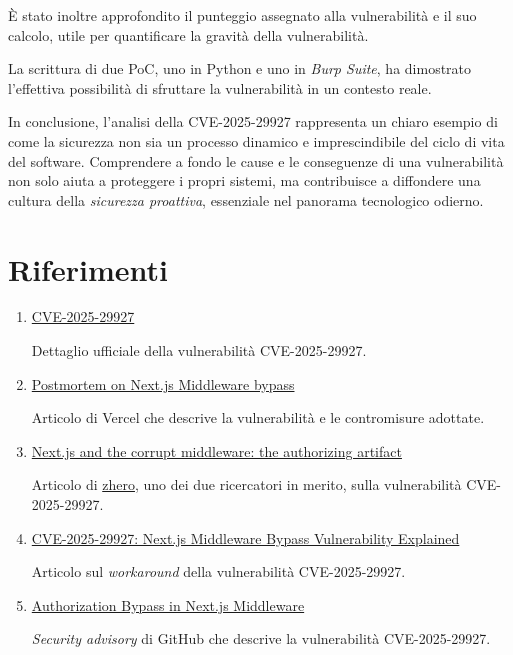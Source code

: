 \documentclass[a4paper,oneside,12pt]{report}
\begin{document}
È stato inoltre approfondito il punteggio assegnato alla vulnerabilit\`a e il suo calcolo, utile per quantificare la gravità della vulnerabilità.

La scrittura di due PoC, uno in Python e uno in \textit{Burp Suite}, ha dimostrato l’effettiva possibilità di sfruttare la vulnerabilit\`a in un contesto reale.

In conclusione, l’analisi della CVE-2025-29927 rappresenta un chiaro esempio di come la sicurezza non sia un processo dinamico e imprescindibile del ciclo di vita del software. Comprendere a fondo le cause e le conseguenze di una vulnerabilità non solo aiuta a proteggere i propri sistemi, ma contribuisce a diffondere una cultura della \emph{sicurezza proattiva}, essenziale nel panorama tecnologico odierno.

\chapter*{Riferimenti}
\label{chap:references}

\begin{enumerate}
	\item \href{https://nvd.nist.gov/vuln/detail/CVE-2025-29927}{CVE-2025-29927}

	Dettaglio ufficiale della vulnerabilità CVE-2025-29927.
	\item \href{https://vercel.com/blog/postmortem-on-next-js-middleware-bypass}{Postmortem on Next.js Middleware bypass}

	Articolo di Vercel che descrive la vulnerabilità e le contromisure adottate.
	\item \href{https://zhero-web-sec.github.io/research-and-things/nextjs-and-the-corrupt-middleware}{Next.js and the corrupt middleware: the authorizing artifact}

	Articolo di \href{https://x.com/zhero___}{zhero}, uno dei due ricercatori in merito, sulla vulnerabilità CVE-2025-29927.
	\item \href{https://www.picussecurity.com/resource/blog/cve-2025-29927-nextjs-middleware-bypass-vulnerability}{CVE-2025-29927: Next.js Middleware Bypass Vulnerability Explained}

	Articolo sul \textit{workaround} della vulnerabilità CVE-2025-29927.
	\item \href{https://github.com/vercel/next.js/security/advisories/GHSA-f82v-jwr5-mffw}{Authorization Bypass in Next.js Middleware}

	\emph{Security advisory} di GitHub che descrive la vulnerabilità CVE-2025-29927.
\end{enumerate}
\end{document}
